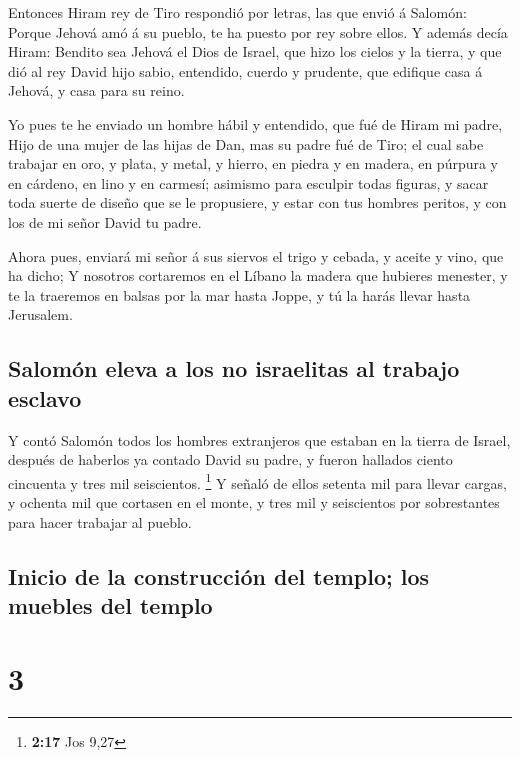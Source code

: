  Entonces Hiram rey de Tiro respondió por letras, las que
envió á Salomón: Porque Jehová amó á su pueblo, te ha puesto por rey
sobre ellos.  Y además decía Hiram: Bendito sea Jehová el
Dios de Israel, que hizo los cielos y la tierra, y que dió al rey David
hijo sabio, entendido, cuerdo y prudente, que edifique casa á Jehová, y
casa para su reino.

 Yo pues te he enviado un hombre hábil y entendido, que
fué de Hiram mi padre,  Hijo de una mujer de las hijas de
Dan, mas su padre fué de Tiro; el cual sabe trabajar en oro, y plata, y
metal, y hierro, en piedra y en madera, en púrpura y en cárdeno, en lino
y en carmesí; asimismo para esculpir todas figuras, y sacar toda suerte
de diseño que se le propusiere, y estar con tus hombres peritos, y con
los de mi señor David tu padre.

 Ahora pues, enviará mi señor á sus siervos el trigo y
cebada, y aceite y vino, que ha dicho;  Y nosotros
cortaremos en el Líbano la madera que hubieres menester, y te la
traeremos en balsas por la mar hasta Joppe, y tú la harás llevar hasta
Jerusalem.

\hypertarget{salomuxf3n-eleva-a-los-no-israelitas-al-trabajo-esclavo}{%
\subsection{Salomón eleva a los no israelitas al trabajo
esclavo}\label{salomuxf3n-eleva-a-los-no-israelitas-al-trabajo-esclavo}}

 Y contó Salomón todos los hombres extranjeros que
estaban en la tierra de Israel, después de haberlos ya contado David su
padre, y fueron hallados ciento cincuenta y tres mil seiscientos.
\footnote{\textbf{2:17} Jos 9,27}  Y señaló de ellos
setenta mil para llevar cargas, y ochenta mil que cortasen en el monte,
y tres mil y seiscientos por sobrestantes para hacer trabajar al pueblo.

\hypertarget{inicio-de-la-construcciuxf3n-del-templo-los-muebles-del-templo}{%
\subsection{Inicio de la construcción del templo; los muebles del
templo}\label{inicio-de-la-construcciuxf3n-del-templo-los-muebles-del-templo}}

\hypertarget{section-2}{%
\section{3}\label{section-2}}

